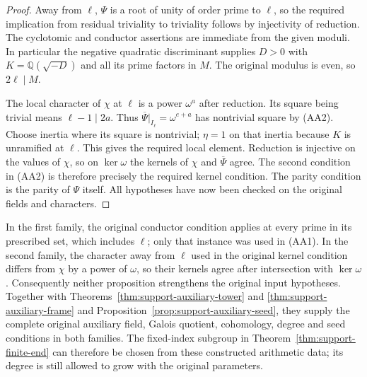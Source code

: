 \begin{proof}
Away from $\ell$, $\Psi$ is a root of unity of order
prime to $\ell$, so the required implication from
residual triviality to triviality follows by injectivity
of reduction.  The cyclotomic and conductor assertions
are immediate from the given moduli.  In particular the
negative quadratic discriminant supplies $D>0$ with
$K=\mathbb Q(\sqrt{-D})$ and all its prime factors in $M$.
The original modulus is even, so $2\ell\mid M$.

The local character of $\chi$ at $\ell$ is a power
$\omega^a$ after reduction.  Its square being trivial
means $\ell-1\mid2a$.  Thus
$\overline\Psi|_{I_\ell}=\omega^{e+a}$ has nontrivial
square by (AA2).  Choose inertia where its square is
nontrivial; $\eta=1$ on that inertia because $K$ is
unramified at $\ell$.  This gives the required local
element.  Reduction is injective on the values of
$\chi$, so on $\ker\omega$ the kernels of $\chi$ and
$\overline\Psi$ agree.  The second condition in (AA2)
is therefore precisely the required kernel condition.
The parity condition is the parity of $\Psi$ itself.
All hypotheses have now been checked on the original
fields and characters.
\end{proof}

In the first family, the original conductor condition applies
at every prime in its prescribed set, which includes $\ell$;
only that instance was used in (AA1).  In the second family,
the character away from $\ell$ used in the original kernel
condition differs from $\chi$ by a power of $\omega$, so
their kernels agree after intersection with $\ker\omega$.
Consequently neither proposition strengthens the original
input hypotheses\cite{AuxTowerSource}.  Together with
Theorems~\ref{thm:support-auxiliary-tower} and
\ref{thm:support-auxiliary-frame} and
Proposition~\ref{prop:support-auxiliary-seed}, they supply
the complete original auxiliary field, Galois quotient,
cohomology, degree and seed conditions in both families.
The fixed-index subgroup in Theorem~\ref{thm:support-finite-end}
can therefore be chosen from these constructed arithmetic
data; its degree is still allowed to grow with the original
parameters.
